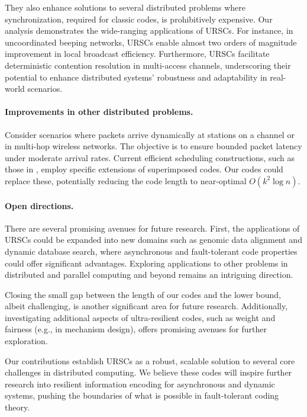 \documentclass[11pt]{article}
\begin{document}
They also enhance solutions to several distributed problems where synchronization, required for classic codes, 
is prohibitively expensive. 
Our analysis demonstrates the wide-ranging applications of URSCs. For instance, 
in uncoordinated beeping networks, URSCs enable almost two orders of magnitude improvement in local 
broadcast efficiency. Furthermore, URSCs facilitate deterministic contention resolution in multi-access 
channels, underscoring their potential to enhance distributed systems' robustness and adaptability in 
real-world scenarios.

\B
\paragraph{Improvements in other distributed problems.}

Consider scenarios where packets arrive dynamically at stations on a channel or in multi-hop wireless networks. The objective is to ensure bounded packet latency under moderate arrival rates. Current efficient scheduling constructions, such as those in \cite{CholviGJK22}, employ specific extensions of superimposed codes. Our codes 
could replace these, potentially reducing the code length 
to near-optimal $O(k^2 \log n)$.

\B
\paragraph{Open directions.}

There are several promising avenues for future research. First, the applications of URSCs could be 
expanded into new domains such as genomic data alignment and dynamic database search, where 
asynchronous and fault-tolerant code properties could offer significant advantages. 
Exploring applications to other problems in distributed and parallel computing and beyond remains 
an intriguing direction. 

Closing the small gap between the length of our codes and the lower bound, albeit challenging, is another 
significant area for future research. Additionally, investigating additional aspects of ultra-resilient codes, 
such as weight and fairness (e.g., in mechanism design), offers promising avenues for further exploration.

Our contributions establish URSCs as a robust, scalable solution to several core challenges in 
distributed computing. We believe these codes will inspire further research into resilient 
information encoding for asynchronous and dynamic systems, pushing the boundaries of what is possible 
in fault-tolerant coding theory.
\end{document}
